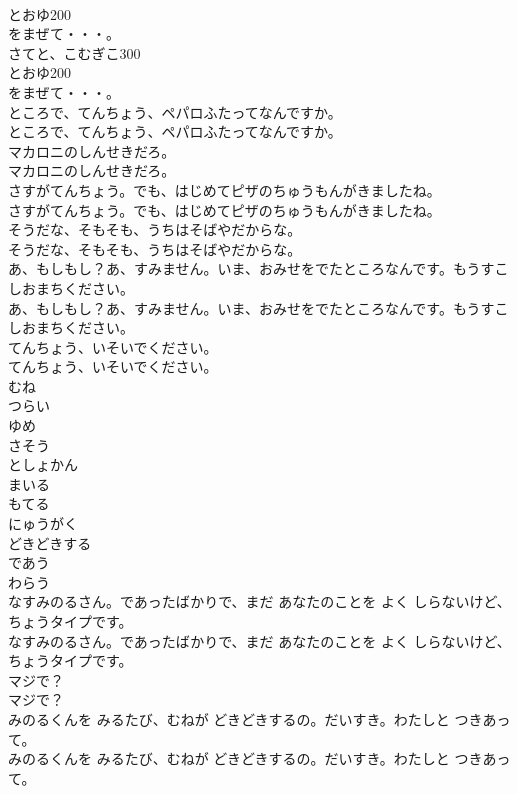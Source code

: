 \documentclass[8pt]{extreport}
\begin{document}
\begin{CJK}{UTF8}{min}
\\	とおゆ200
\\	をまぜて・・・。	
\\	さてと、こむぎこ300
\\	とおゆ200
\\	をまぜて・・・。 
\\	ところで、てんちょう、ペパロふたってなんですか。	
\\	ところで、てんちょう、ペパロふたってなんですか。 
\\	マカロニのしんせきだろ。	
\\	マカロニのしんせきだろ。 
\\	さすがてんちょう。でも、はじめてピザのちゅうもんがきましたね。	
\\	さすがてんちょう。でも、はじめてピザのちゅうもんがきましたね。 
\\	そうだな、そもそも、うちはそばやだからな。	
\\	そうだな、そもそも、うちはそばやだからな。 
\\	あ、もしもし？あ、すみません。いま、おみせをでたところなんです。もうすこしおまちください。	
\\	あ、もしもし？あ、すみません。いま、おみせをでたところなんです。もうすこしおまちください。 
\\	てんちょう、いそいでください。	
\\	てんちょう、いそいでください。 
\\	むね
\\	つらい
\\	ゆめ
\\	さそう
\\	としょかん
\\	まいる
\\	もてる
\\	にゅうがく
\\	どきどきする
\\	であう
\\	わらう
\\	なすみのるさん。であったばかりで、まだ あなたのことを よく しらないけど、ちょうタイプです。	
\\	なすみのるさん。であったばかりで、まだ あなたのことを よく しらないけど、ちょうタイプです。 
\\	マジで？	
\\	マジで？ 
\\	みのるくんを みるたび、むねが どきどきするの。だいすき。わたしと つきあって。	
\\	みのるくんを みるたび、むねが どきどきするの。だいすき。わたしと つきあって。 

\end{CJK}
\end{document}
